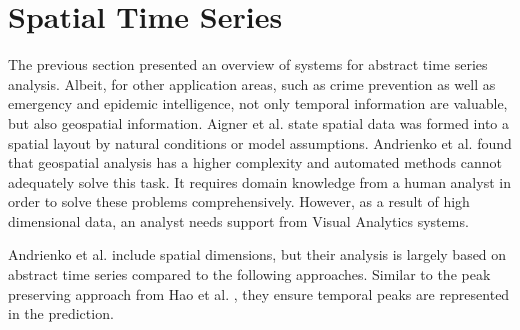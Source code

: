 \documentclass[electronic]{vgtc}             %
\begin{document}
\section{Spatial Time Series\label{sec:spatiotemp}}
The previous section presented an overview of systems for abstract time series analysis. 
Albeit, for other application areas, such as crime prevention as well as emergency and epidemic intelligence, not only temporal information are valuable, but also geospatial information.
Aigner et al. \cite{Aigner:2007} state spatial data was formed into a spatial layout by natural conditions or model assumptions.
Andrienko et al. \cite{Andrienko:2008, Andrienko:2010:Space} found that geospatial analysis has a higher complexity and automated methods cannot adequately solve this task. 
It requires domain knowledge from a human analyst in order to solve these problems comprehensively.
However, as a result of high dimensional data, an analyst needs support from Visual Analytics systems.

Andrienko et al. \cite{Andrienko:2010} include spatial dimensions, but their analysis is largely based on abstract time series compared to the following approaches.
Similar to the peak preserving approach from Hao et al. \cite{Hao:2012}, they ensure temporal peaks are represented in the prediction. 
\end{document}

